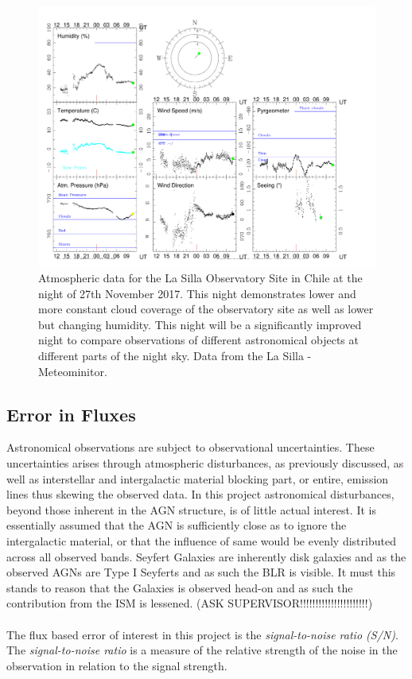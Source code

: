 \documentclass[a4paper, 12pt, twoside]{article}
\begin{document}
\begin{figure}[htp!]
\includegraphics[width=1.1\linewidth]{Figure/end171127.pdf}
\caption{Atmospheric data for the La Silla Observatory Site in Chile at the night of 27th November 2017. This night demonstrates lower and more constant cloud coverage of the observatory site as well as lower but changing humidity. This night will be a significantly improved night to compare observations of different astronomical objects at different parts of the night sky. Data from the La Silla - Meteominitor.}
\label{fig:good_night}
\end{figure}

\subsection{Error in Fluxes}
Astronomical observations are subject to observational uncertainties. These uncertainties arises through atmospheric disturbances, as previously discussed, as well as interstellar and intergalactic material blocking part, or entire, emission lines thus skewing the observed data. In this project astronomical disturbances, beyond those inherent in the AGN structure, is of little actual interest. It is essentially assumed that the AGN is sufficiently close as to ignore the intergalactic material, or that the influence of same would be evenly distributed across all observed bands. Seyfert Galaxies are inherently disk galaxies and as the observed AGNs are Type I Seyferts and as such the BLR is visible. It must this stands to reason that the Galaxies is observed head-on and as such the contribution from the ISM is lessened. (ASK SUPERVISOR!!!!!!!!!!!!!!!!!!!!!!)\\
\\
The flux based error of interest in this project is the \emph{signal-to-noise ratio (S/N)}. The \emph{signal-to-noise ratio} is a measure of the relative strength of the noise in the observation in relation to the signal strength. 
\end{document}
